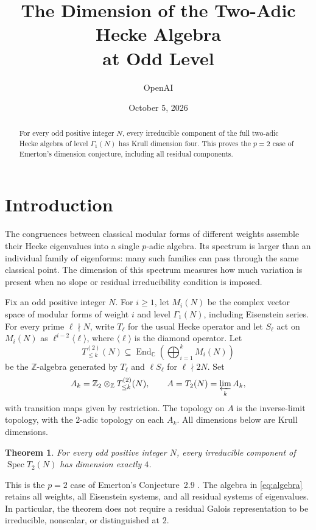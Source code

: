 \documentclass[11pt]{article}
\title{The Dimension of the Two-Adic Hecke Algebra\\at Odd Level}
\author{OpenAI}
\date{October 5, 2026}
\newtheorem{theorem}{Theorem}[section]
\theoremstyle{remark}
\numberwithin{equation}{section}
\newcommand{\Z}{\mathbb Z}
\newcommand{\C}{\mathbb C}
\DeclareMathOperator{\Spec}{Spec}
\DeclareMathOperator{\End}{End}
\begin{document}
\maketitle

\begin{abstract}
For every odd positive integer $N$, every irreducible component of the
full two-adic Hecke algebra of level $\Gamma_1(N)$ has Krull dimension
four. This proves the $p=2$ case of Emerton's dimension conjecture,
including all residual components.
\end{abstract}

\section{Introduction}
\label{sec:introduction}

The congruences between classical modular forms of different weights
assemble their Hecke eigenvalues into a single $p$-adic algebra. Its
spectrum is larger than an individual family of eigenforms: many such
families can pass through the same classical point. The dimension of
this spectrum measures how much variation is present when no slope or
residual irreducibility condition is imposed.

Fix an odd positive integer $N$. For $i\geq1$, let $M_i(N)$ be the
complex vector space of modular forms of weight $i$ and level
$\Gamma_1(N)$, including Eisenstein series. For every prime $\ell\nmid N$,
write $T_\ell$ for the usual Hecke operator and let $S_\ell$ act on
$M_i(N)$ as $\ell^{i-2}\langle\ell\rangle$, where
$\langle\ell\rangle$ is the diamond operator. Let
\[
 T_{\leq k}^{(2)}(N)
 \subseteq \End_{\C}\!\left(\bigoplus_{i=1}^k M_i(N)\right)
\]
be the $\Z$-algebra generated by $T_\ell$ and $\ell S_\ell$ for
$\ell\nmid2N$. Set
\begin{equation}\label{eq:algebra}
 A_k=\Z_2\otimes_{\Z}T_{\leq k}^{(2)}(N),
 \qquad A=T_2(N)=\varprojlim_k A_k,
\end{equation}
with transition maps given by restriction. The topology on $A$ is the
inverse-limit topology, with the $2$-adic topology on each $A_k$.
All dimensions below are Krull dimensions.

\begin{theorem}\label{thm:main}
For every odd positive integer $N$, every irreducible component of
$\Spec T_2(N)$ has dimension exactly $4$.
\end{theorem}

This is the $p=2$ case of Emerton's Conjecture~2.9
\cite{Emerton11}. The algebra in \eqref{eq:algebra} retains all weights,
all Eisenstein systems, and all residual systems of eigenvalues. In
particular, the theorem does not require a residual Galois representation
to be irreducible, nonscalar, or distinguished at $2$.
\end{document}
